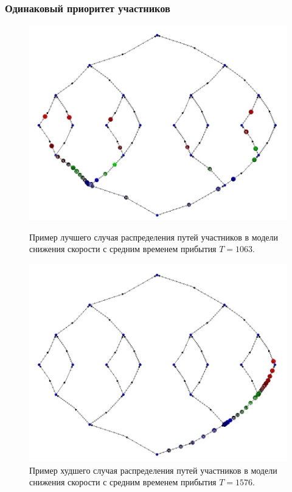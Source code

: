 \documentclass{beamer}
\begin{document}
\begin{frame}\frametitle{Одинаковый приоритет участников}
\begin{figure}[H]
	\begin{center}
		\begin{minipage}[h]{0.45\linewidth}
			\includegraphics[width=1\linewidth]{imgs/average_good.jpg}
			\caption{Пример лучшего случая распределения путей участников в модели снижения скорости с средним временем прибытия $T = 1063$.}
		\end{minipage}
		\hfill
		\begin{minipage}[h]{0.45\linewidth}
			\includegraphics[width=1\linewidth]{imgs/average_bad.jpg}
			\caption{Пример худшего случая распределения путей участников в модели снижения скорости с средним временем прибытия $T = 1576$.}
		\end{minipage}
	\end{center}
\end{figure}
\end{frame}
\end{document}
